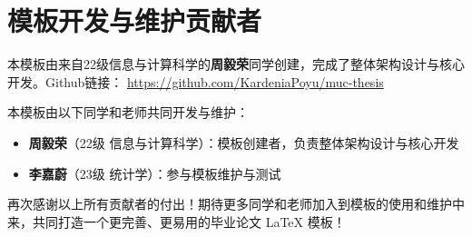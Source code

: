 \chapter*{模板开发与维护贡献者}
\thispagestyle{empty}
\pagestyle{empty}

\vspace{1em}

本模板由来自22级信息与计算科学的\textbf{周毅荣}同学创建，完成了整体架构设计与核心开发。Github链接：{\color{blue} \url{https://github.com/KardeniaPoyu/muc-thesis}}

本模板由以下同学和老师共同开发与维护：
\begin{itemize}
    \item \textbf{周毅荣}（22级 信息与计算科学）：模板创建者，负责整体架构设计与核心开发
    \item \textbf{李嘉蔚}（23级 统计学）：参与模板维护与测试
\end{itemize}

\vspace{2em}

\begin{center}
再次感谢以上所有贡献者的付出！期待更多同学和老师加入到模板的使用和维护中来，共同打造一个更完善、更易用的毕业论文 \LaTeX{} 模板！
\end{center}
